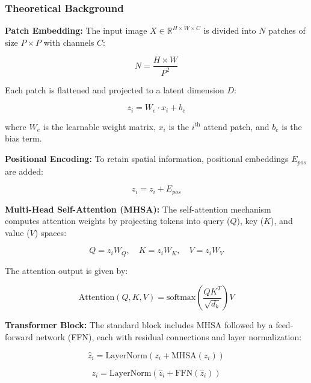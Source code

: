 \documentclass[fleqn,10pt,lineno]{wlpeerj}
\begin{document}
\subsubsection{Theoretical Background}
\textbf{Patch Embedding:} The input image $X \in \mathbb{R}^{H \times W \times C}$ is divided into $N$ patches of size $P \times P$ with channels $C$:

\begin{equation}
N = \frac{H \times W}{P^2}
\end{equation}


Each patch is flattened and projected to a latent dimension $D$:

\begin{equation}
z_i = W_e \cdot x_i + b_e
\end{equation}

where $W_e$ is the learnable weight matrix, $x_i$ is the $i^\text{th}$ attend patch, and $b_e$ is the bias term.

\textbf{Positional Encoding:} To retain spatial information, positional embeddings $E_{pos}$ are added:

\begin{equation}
z_i = z_i + E_{pos}
\end{equation}

\textbf{Multi-Head Self-Attention (MHSA):} The self-attention mechanism computes attention weights by projecting tokens into query ($Q$), key ($K$), and value ($V$) spaces:

\begin{equation}
Q = z_i W_Q,\quad K = z_i W_K,\quad V = z_i W_V
\end{equation}


The attention output is given by:

\begin{equation}
\text{Attention}(Q, K, V) = \text{softmax}\left(\frac{Q K^T}{\sqrt{d_k}}\right) V
\end{equation}


\textbf{Transformer Block:} The standard block includes MHSA followed by a feed-forward network (FFN), each with residual connections and layer normalization:

\begin{equation}
\hat{z}_i = \text{LayerNorm}(z_i + \text{MHSA}(z_i))
\end{equation}

\begin{equation}
z_i = \text{LayerNorm}(\hat{z}_i + \text{FFN}(\hat{z}_i))
\end{equation}
\end{document}
